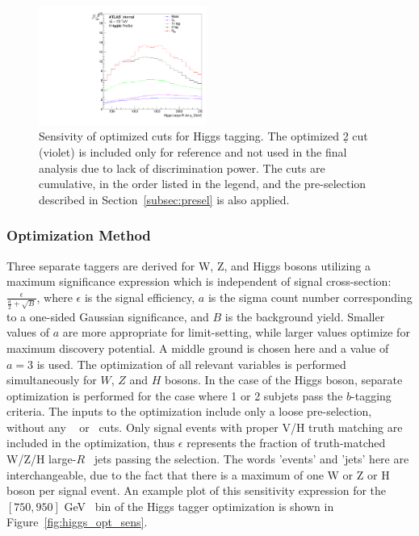 \begin{figure}[htbp!]
\begin{center}
    \includegraphics[width=0.49\textwidth]{PlotHTagSensitivityWithD2.pdf}
\end{center}
\caption{Sensivity of optimized cuts for Higgs tagging. The optimized \d2 cut (violet) is included only for reference and not used in the final analysis due to lack of discrimination power.
    The cuts are cumulative, in the order listed in the legend, and the pre-selection described in Section~\ref{subsec:presel} is also applied.
}
\label{fig:htag_sens_d2}
\end{figure}

\subsubsection{Optimization Method}
\label{subsec:tagger_opt}
Three separate taggers are derived for W, Z, and Higgs bosons utilizing a maximum significance expression \cite{punzi2003sensitivity} which is independent of signal cross-section: $\frac{\epsilon}{\frac{a}{2}+\sqrt{B}}$, where $\epsilon$ is the signal efficiency, $a$ is the sigma count number corresponding to a one-sided Gaussian significance, and $B$ is the background yield.
Smaller values of $a$ are more appropriate for limit-setting, while larger values optimize for maximum discovery potential.
A middle ground is chosen here and a value of $a = 3$ is used.
The optimization of all relevant variables is performed simultaneously for $W$, $Z$ and $H$ bosons.
In the case of the Higgs boson, separate optimization is performed for the case where 1 or 2 subjets pass the $b$-tagging criteria.
The inputs to the optimization include only a loose pre-selection, without any ~ or ~\mvh cuts.
Only signal events with proper V/H truth matching are included in the optimization, thus $\epsilon$ represents the fraction of truth-matched W/Z/H large-$R$ ~jets passing the selection.
The words 'events' and 'jets' here are interchangeable, due to the fact that there is a maximum of one W or Z or H boson per signal event.
An example plot of this sensitivity expression for the $[750,950]$ GeV \pt\ bin of the Higgs tagger optimization is shown in Figure~\ref{fig:higgs_opt_sens}.

